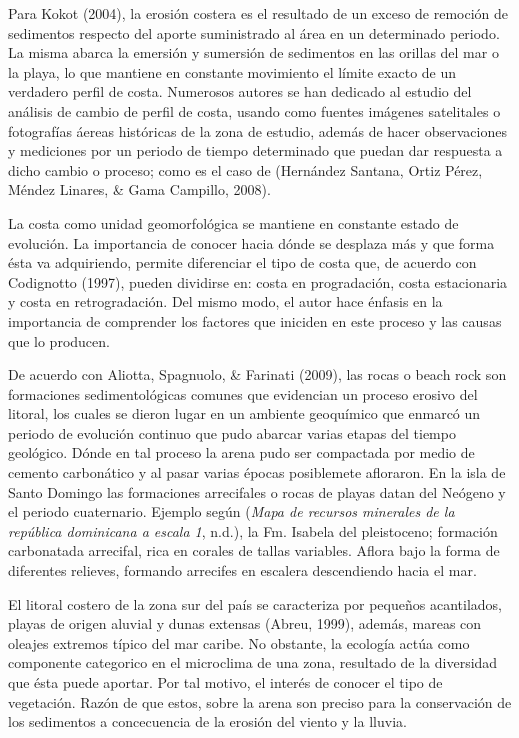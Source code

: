 \documentclass[11pt,]{article}
\begin{document}
Para Kokot (2004), la erosión costera es el resultado de un exceso de
remoción de sedimentos respecto del aporte suministrado al área en un
determinado periodo. La misma abarca la emersión y sumersión de
sedimentos en las orillas del mar o la playa, lo que mantiene en
constante movimiento el límite exacto de un verdadero perfil de costa.
Numerosos autores se han dedicado al estudio del análisis de cambio de
perfil de costa, usando como fuentes imágenes satelitales o fotografías
áereas históricas de la zona de estudio, además de hacer observaciones y
mediciones por un periodo de tiempo determinado que puedan dar respuesta
a dicho cambio o proceso; como es el caso de (Hernández Santana, Ortiz
Pérez, Méndez Linares, \& Gama Campillo, 2008).

La costa como unidad geomorfológica se mantiene en constante estado de
evolución. La importancia de conocer hacia dónde se desplaza más y que
forma ésta va adquiriendo, permite diferenciar el tipo de costa que, de
acuerdo con Codignotto (1997), pueden dividirse en: costa en
progradación, costa estacionaria y costa en retrogradación. Del mismo
modo, el autor hace énfasis en la importancia de comprender los factores
que iniciden en este proceso y las causas que lo producen.

De acuerdo con Aliotta, Spagnuolo, \& Farinati (2009), las rocas o beach
rock son formaciones sedimentológicas comunes que evidencian un proceso
erosivo del litoral, los cuales se dieron lugar en un ambiente
geoquímico que enmarcó un periodo de evolución continuo que pudo abarcar
varias etapas del tiempo geológico. Dónde en tal proceso la arena pudo
ser compactada por medio de cemento carbonático y al pasar varias épocas
posiblemete afloraron. En la isla de Santo Domingo las formaciones
arrecifales o rocas de playas datan del Neógeno y el periodo
cuaternario. Ejemplo según (\emph{Mapa de recursos minerales de la
república dominicana a escala 1}, n.d.), la Fm. Isabela del pleistoceno;
formación carbonatada arrecifal, rica en corales de tallas variables.
Aflora bajo la forma de diferentes relieves, formando arrecifes en
escalera descendiendo hacia el mar.

El litoral costero de la zona sur del país se caracteriza por pequeños
acantilados, playas de origen aluvial y dunas extensas (Abreu, 1999),
además, mareas con oleajes extremos típico del mar caribe. No obstante,
la ecología actúa como componente categorico en el microclima de una
zona, resultado de la diversidad que ésta puede aportar. Por tal motivo,
el interés de conocer el tipo de vegetación. Razón de que estos, sobre
la arena son preciso para la conservación de los sedimentos a
concecuencia de la erosión del viento y la lluvia.
\end{document}
